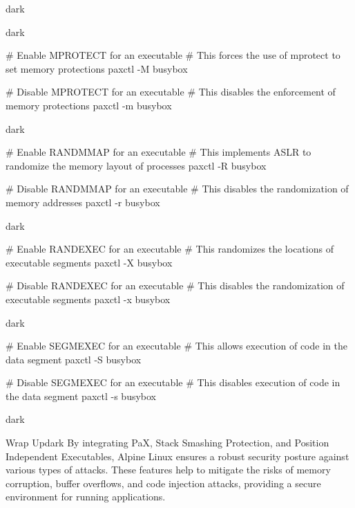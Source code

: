 \begin{baseBoxThree}{}{dark}
    \label{MPROTECT}
    \begin{baseBoxThree}{}{dark}
        \begin{posnex}
# Enable MPROTECT for an executable
# This forces the use of mprotect to set memory protections
paxctl -M busybox

# Disable MPROTECT for an executable
# This disables the enforcement of memory protections
paxctl -m busybox
        \end{posnex}
    \end{baseBoxThree}
    \smallskip
    \label{RANDMMAP}
    \begin{baseBoxThree}{}{dark}
        \begin{posnex}
# Enable RANDMMAP for an executable
# This implements ASLR to randomize the memory layout of processes
paxctl -R busybox

# Disable RANDMMAP for an executable
# This disables the randomization of memory addresses
paxctl -r busybox
        \end{posnex}
    \end{baseBoxThree}
    \smallskip
    \label{RANDEXEC}
    \begin{baseBoxThree}{}{dark}
        \begin{posnex}
    # Enable RANDEXEC for an executable
    # This randomizes the locations of executable segments
    paxctl -X busybox
    
    # Disable RANDEXEC for an executable
    # This disables the randomization of executable segments
    paxctl -x busybox
        \end{posnex}
    \end{baseBoxThree}
    \smallskip
    \label{SEGMEXEC}
    \begin{baseBoxThree}{}{dark}
        \begin{posnex}
# Enable SEGMEXEC for an executable
# This allows execution of code in the data segment
paxctl -S busybox

# Disable SEGMEXEC for an executable
# This disables execution of code in the data segment
paxctl -s busybox        
        \end{posnex}
    \end{baseBoxThree}
    \smallskip
\end{baseBoxThree}

\begin{baseBoxThree}{}{dark}
    \smallskip
    \begin{baseBoxThree}{Wrap Up}{dark}
        By integrating PaX, Stack Smashing Protection, and Position Independent Executables, Alpine Linux ensures a robust security posture against various types of attacks.
        These features help to mitigate the risks of memory corruption, buffer overflows, and code injection attacks, providing a secure environment for running applications.
    \end{baseBoxThree}
    \smallskip
\end{baseBoxThree}
